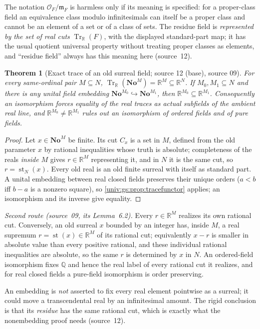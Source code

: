 \documentclass[11pt,letterpaper]{article}
\numberwithin{equation}{section}
\newtheorem{theorem}{Theorem}[section]
\theoremstyle{definition}
\theoremstyle{remark}
\newcommand{\No}{\mathbf{No}}
\newcommand{\NoM}{\No^{M}}
\newcommand{\R}{\mathbb R}
\newcommand{\Q}{\mathbb Q}
\newcommand{\Tr}{\operatorname{Tr}_{\R}}
\newcommand{\st}{\operatorname{st}}
\begin{document}
The notation $\mathcal O_F/\mathfrak m_F$ is harmless only if its meaning is specified: for a
proper-class field an equivalence class modulo infinitesimals can itself be a proper class
and cannot be an element of a set or of a class of sets. The residue field is
\emph{represented by the set of real cuts} $\Tr(F)$, with the displayed standard-part map;
it has the usual quotient universal property without treating proper classes as elements,
and ``residue field'' always has this meaning here (source~12).

\begin{theorem}[Exact trace of an old surreal field; source 12 (base), source 09]\label{univ:gs:thm:oldtrace}
For every same-ordinal pair $M\subseteq N$, $\Tr(\NoM)=\R^M\subseteq\R^N$. If
$M_0,M_1\subseteq N$ and there is any unital field embedding $\No^{M_0}\hookrightarrow\No^{M_1}$,
then $\R^{M_0}\subseteq\R^{M_1}$. Consequently an isomorphism forces equality of the real
traces as actual subfields of the ambient real line, and $\R^{M_0}\ne\R^{M_1}$ rules out an
isomorphism of ordered fields and of pure fields.
\end{theorem}
\begin{proof}
Let $x\in\NoM$ be finite. Its cut $C_x$ is a set in $M$, defined from the old parameter $x$
by rational inequalities whose truth is absolute; completeness of the reals \emph{inside $M$}
gives $r\in\R^M$ representing it, and in $N$ it is the same cut, so $r=\st_N(x)$. Every old
real is an old finite surreal with itself as standard part. A unital embedding between real
closed fields preserves their unique orders ($a<b$ iff $b-a$ is a nonzero square), so
\cref{univ:gs:prop:tracefunctor} applies; an isomorphism and its inverse give equality.
\end{proof}

\emph{Second route (source~09, its Lemma~6.2).} Every $r\in\R^M$ realizes its own rational
cut. Conversely, an old surreal $x$ bounded by an integer has, inside $M$, a real supremum
$r=\st(x)\in\R^M$ of its rational cut; equivalently $x-r$ is smaller in absolute value than
every positive rational, and these individual rational inequalities are absolute, so the same
$r$ is determined by $x$ in $N$. An ordered-field isomorphism fixes $\Q$ and hence the real
label of every rational cut it realizes, and for real closed fields a pure-field isomorphism
is order preserving.

An embedding is \emph{not} asserted to fix every real element pointwise as a surreal; it
could move a transcendental real by an infinitesimal amount. The rigid conclusion is that its
\emph{residue} has the same rational cut, which is exactly what the nonembedding proof needs
(source~12).
\end{document}
